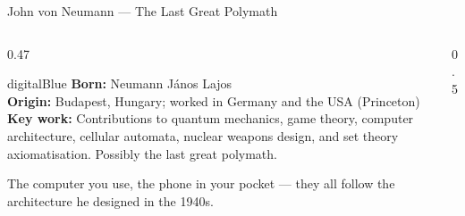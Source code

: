 \begin{frame}[shrink=8]{John von Neumann --- The Last Great Polymath}

  \begin{columns}[T]
    \begin{column}{0.47\textwidth}
      \begin{personbox}{digitalBlue}
        \textbf{Born:} Neumann J\'anos Lajos\\
        \textbf{Origin:} Budapest, Hungary; worked in Germany and
        the USA (Princeton)\\[3pt]
        \textbf{Key work:} Contributions to quantum mechanics, game theory,
        computer architecture, cellular automata, nuclear weapons design,
        and set theory axiomatisation. Possibly the last great polymath.
      \end{personbox}

      \vspace{0.3em}
      \begin{insightbox}
        The computer you use, the phone in your pocket --- they all follow
        the architecture he designed in the 1940s.
      \end{insightbox}
    \end{column}

    \begin{column}{0.5\textwidth}
    \end{column}
  \end{columns}

\end{frame}

